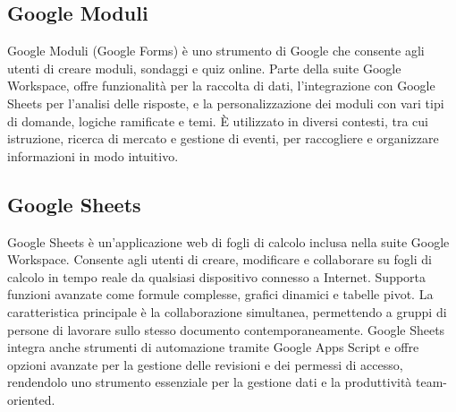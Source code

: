 \vspace{2em}
\subsection*{Google Moduli}
\par Google Moduli (Google Forms) è uno strumento di Google che consente agli utenti di creare moduli, sondaggi e quiz online. Parte della suite Google Workspace, offre funzionalità per la raccolta di dati, l'integrazione con Google Sheets per l'analisi delle risposte, e la personalizzazione dei moduli con vari tipi di domande, logiche ramificate e temi. È utilizzato in diversi contesti, tra cui istruzione, ricerca di mercato e gestione di eventi, per raccogliere e organizzare informazioni in modo intuitivo.

\vspace{2em}
\subsection*{Google Sheets}
\par Google Sheets è un'applicazione web di fogli di calcolo inclusa nella suite Google Workspace. Consente agli utenti di creare, modificare e collaborare su fogli di calcolo in tempo reale da qualsiasi dispositivo connesso a Internet. Supporta funzioni avanzate come formule complesse, grafici dinamici e tabelle pivot. La caratteristica principale è la collaborazione simultanea, permettendo a gruppi di persone di lavorare sullo stesso documento contemporaneamente. Google Sheets integra anche strumenti di automazione tramite Google Apps Script e offre opzioni avanzate per la gestione delle revisioni e dei permessi di accesso, rendendolo uno strumento essenziale per la gestione dati e la produttività team-oriented.
